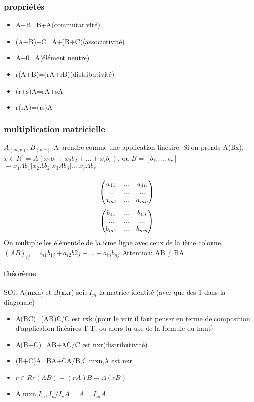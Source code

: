 \documentclass[a4paper,10pt]{article}
\begin{document}
\subsubsection{propriétés}
\begin{itemize}
 \item A+B=B+A(commutativité)
 \item (A+B)+C=A+(B+C)(associativité)
 \item A+0=A(élément neutre)
 \item r(A+B)=(rA+rB)(distributivité)
 \item (r+s)A=rA+sA
 \item r(sA)=(rs)A
\end{itemize}
\subsubsection{multiplication matricielle}
$A_{(m,n)},B_{(n,r)}$
A prendre comme une application linéaire.
\newline
Si on prends A(Bx), $x\in R^r=A(x_1b_1+x_2b_2+...+x_rb_r)$, ou $B=[b_1,...,b_r]$
\newline
$=x_1Ab_1|x_2Ab_2|x_3Ab_3|...|x_rAb_r$
\paragraph{}
\[
\begin{pmatrix}
a_{11}&...&a_{1n}\cr
...&...&...\cr
a_{m1}&...&a_{mn}\cr
\end{pmatrix}
\]
\[
\begin{pmatrix}
b_{11}&...&b_{1n}\cr
...&...&...\cr
b_{m1}&...&b_{mn}\cr
\end{pmatrix}
\]
\newline
On multiplie les élémentde de la ième ligne avec ceux de la ième colonne. $(AB)_{ij}=a_{i1}b_{1j}+a_{i2}b{2j}+...+a_{in}b_{nj}$
\newline
Attention: AB$\neq$BA
\paragraph{théorème}
SOit A(mxn) et B(nxr)
\newline
soit $I_m$ la matrice identité (avec que des 1 dans la diagonale)
\begin{itemize}
 \item A(BC)=(AB)C/C est rxk (pour le voir il faut penser en terme de composition d'application linéaires T.T, ou alors tu use de la formule du haut)
 \item A(B+C)=AB+AC/C est nxr(distributivité)
 \item (B+C)A=BA+CA/B,C mxn,A est nxr
 \item $r\in R r(AB)=(rA)B=A(rB)$
 \item A mxn,$I_m,I_n/I_nA=A=I_mA$
 
 \end{itemize}
 
\end{document}
